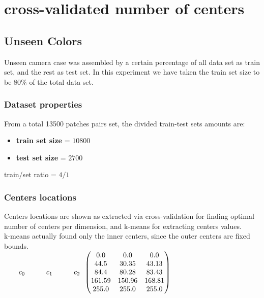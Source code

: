\section{cross-validated number of centers}
\subsection{Unseen Colors}

Unseen camera case was assembled by a certain percentage of all data set as train set, and the rest as test set. In this experiment we have taken the train set size to be $80 \%$ of the total data set.
		
		\subsubsection{Dataset properties}
		
			From a total 13500 patches pairs set, the divided train-test sets amounts are:
			\begin{itemize}
				\item \textbf{train set size} = $10800$ 
				\item \textbf{test set size} = $2700$
			\end{itemize}
			
			train/set ratio = $4/1$
			
		\subsubsection{Centers locations}
		
		Centers locations are shown as extracted via cross-validation for finding optimal number of centers per dimension, and k-means for extracting centers values. \\
		k-means actually found only the inner centers, since the outer centers are fixed bounds.\\
		
		$\begin{matrix}  \qquad  c_0 \quad  \qquad c_1 \quad  \qquad c_2 \end{matrix}\\
				
		
		\begin{pmatrix}
				     0.0 &     0.0 &    0.0\\
					44.5 &   30.35 &    43.13 \\
					84.4 &   80.28 &    83.43 \\
					161.59 &   150.96 &   168.81\\
		     		 255.0 &  255.0 &   255.0 \\
				\end{pmatrix}$\\

